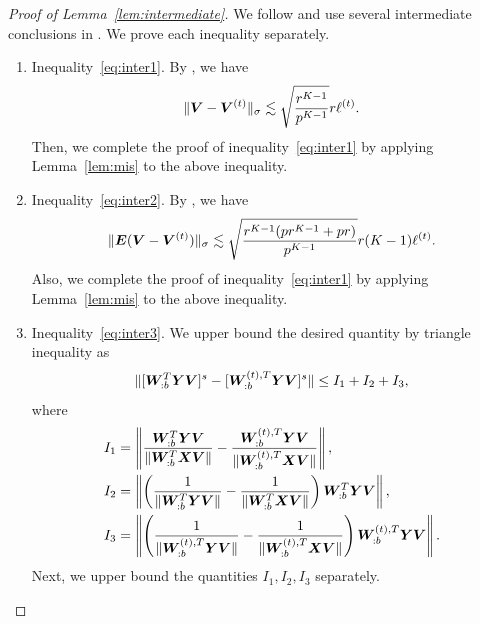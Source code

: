 \documentclass[lettersize,journal]{IEEEtran}
\theoremstyle{definition}
\theoremstyle{definition}
\newcommand{\of}[1]{\left(#1\right)}
\begin{document}
    \begin{proof}[Proof of Lemma~\ref{lem:intermediate}] We follow and use several intermediate conclusions in \citet[Proof of Lemma 5]{han2020exact}. We prove each inequality separately.
    \begin{enumerate}
    \item Inequality~\eqref{eq:inter1}. By \citet[Proof of Lemma 5]{han2020exact}, we have 
    \begin{equation}
         \lVert\bm{V} - \bm{V}^{(t)}\rVert_{\sigma} \lesssim \sqrt{\frac{r^{K-1}}{p^{K-1}}} r \ell^{(t)}.
    \end{equation}
    Then, we complete the proof of inequality~\eqref{eq:inter1} by applying Lemma~\ref{lem:mis} to the above inequality.
    \item Inequality~\eqref{eq:inter2}. By \citet[Proof of Lemma 5]{han2020exact}, we have 
    \begin{equation}
           \lVert\bm{E} (\bm{V} - \bm{V}^{(t)})\rVert_{\sigma} \lesssim \sqrt{ \frac{r^{K-1}(p r^{K-1} + p r)}{p^{K-1}}} r(K-1) \ell^{(t)}.
    \end{equation}
    Also, we complete the proof of inequality~\eqref{eq:inter1} by applying Lemma~\ref{lem:mis} to the above inequality.
    
    \item Inequality~\eqref{eq:inter3}. We upper bound the desired quantity by triangle inequality as
    \begin{equation}
        \lVert [ \bm{W}_{:b}^T \bm Y \bm{V} ]^s   -  [ \bm{W}_{:b}^{(t), T} \bm Y \bm{V}  ]^s \rVert \leq I_1 + I_2 + I_3,
    \end{equation}
    where 
    \begin{align}
        I_1 &=  \onorm{ \frac{ \mW_{:b}^T \mY \mV  }{\onormSize{}{  \mW_{:b}^T \mX \mV }} - \frac{ \mW_{:b}^{(t), T} \mY \mV  }{ \onormSize{}{\mW_{:b}^{(t), T} \mX \mV }}   },\\
        I_2 & = \onorm{\of{ \frac{1}{\onormSize{}{\mW_{:b}^T \mY \mV}} -  \frac{1}{\onormSize{}{\mW_{:b}^T \mX \mV}}  } \mW_{:b}^T \mY \mV },\\
        I_3 &= \onorm{\of{ \frac{1}{\onormSize{}{\mW_{:b}^{(t), T} \mY \mV  }} -  \frac{1}{\onormSize{}{\mW_{:b}^{(t), T} \mX \mV  }}  } \mW_{:b}^{(t), T} \mY \mV }.
    \end{align}
    Next, we upper bound the quantities $I_1, I_2, I_3$ separately. 
    

\end{enumerate}
\end{proof}
\end{document}
